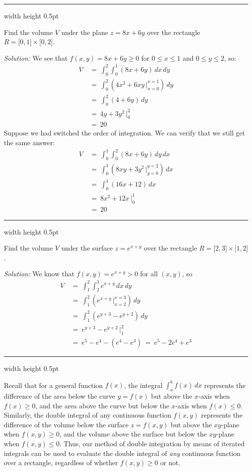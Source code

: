 \medskip
\hrule width \textwidth height 0.5pt
\begin{exmp}\label{exmp:volplane}
 Find the volume $V$ under the plane $z=8x+6y$ over the rectangle $R = \lbrack 0,1 \rbrack \times \lbrack 0,2 \rbrack$.
 \smallskip
 \par\noindent \emph{Solution:} We see that $f(x,y)=8x+6y \ge 0$ for $0 \le x \le 1$ and $0 \le y \le 2$, so:
 \begin{align*}
  V ~&=~ \int_0^2 \int_0^1 (8x+6y)\,dx \,dy\\
   &=~ \int_0^2 \left( 4x^2 + 6xy \,\Big|_{x=0}^{x=1} \right) \,dy\\
   &=~ \int_0^2 (4+6y) \,dy\\
   &=~ 4y+3y^2 \,\Big|_0^2\\
   &=~ 20
 \end{align*}
Suppose we had switched the order of integration. 
We can verify that we still get the same answer:
 \begin{align*}
  V ~&=~ \int_0^1 \int_0^2 (8x+6y)\,dy \,dx\\
   &=~ \int_0^1 \left( 8xy + 3y^2 \,\Big|_{y=0}^{y=2} \right) \,dx\\
   &=~ \int_0^1 (16x+12) \,dx\\
   &=~ 8x^2 + 12x \,\Big|_0^1\\
   &=~ 20
 \end{align*}
\end{exmp}
\hrule width \textwidth height 0.5pt
\begin{exmp}
 Find the volume $V$ under the surface $z=e^{x+y}$ over the rectangle $R = \lbrack 2,3 \rbrack \times \lbrack 1,2
  \rbrack$.\smallskip
 \par\noindent \emph{Solution:} We know that $f(x,y)=e^{x+y} > 0$ for all $(x,y)$, so
 \begin{align*}
  V ~&=~ \int_1^2 \int_2^3 e^{x+y} \,dx \,dy\\
   &=~ \int_1^2 \left( e^{x+y} \,\Big|_{x=2}^{x=3} \right) \,dy\\
   &=~ \int_1^2 (e^{y+3} - e^{y+2}) \,dy\\
   &=~ e^{y+3} - e^{y+2} \,\Big|_1^2\\
   &=~ e^5 - e^4 - ( e^4 - e^3 ) ~=~ e^5 - 2e^4 + e^3
 \end{align*}
\end{exmp}
\hrule width \textwidth height 0.5pt
\medskip

Recall that for a general function $f(x)$, the integral $\int_a^b f(x)\, dx$ represents the difference of the area
below the curve $y=f(x)$ but above the $x$-axis when $f(x) \ge 0$, and the area above the curve but below the $x$-axis
when $f(x) \le 0$. Similarly, the double integral of any continuous function $f(x,y)$ represents the difference of the
volume below the surface $z=f(x,y)$ but above the $xy$-plane when $f(x,y) \ge 0$, and the volume above the surface but
below the $xy$-plane when $f(x,y) \le 0$. Thus, our method of double integration by means of iterated integrals can
be used to evaluate the double integral of \emph{any} continuous function over a rectangle, regardless of whether
$f(x,y) \ge 0$ or not.

